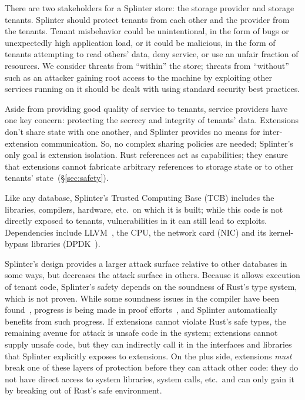 There are two stakeholders for a Splinter store: the storage
provider and storage tenants. Splinter should protect tenants from each other
and the provider from the tenants. Tenant
misbehavior could be unintentional, in the form of bugs or unexpectedly high
application load, or it could be malicious, in the form of tenants attempting
to read others' data, deny service, or use an unfair fraction of resources.
We consider threats from ``within'' the store; threats from ``without'' such
as an attacker gaining root access to the machine by exploiting other services
running on it should be dealt with using standard security best practices.


Aside from providing good quality of service to tenants, service providers
  have one key concern: protecting the secrecy and integrity of tenants' data.
Extensions don't share state with one another, and Splinter provides no means for
inter-extension communication. So, no complex sharing policies are needed;
Splinter's only goal is extension isolation.
Rust references act as capabilities; they ensure that extensions cannot
fabricate arbitrary references
to storage state or to other tenants' state~(\S\ref{sec:safety}).

Like any database, Splinter's Trusted Computing Base (TCB) includes the
    libraries, compilers, hardware, etc.\ on which it is built; while
    this code is not directly exposed to tenants, vulnerabilities in it can
    still lead to exploits.
Dependencies include LLVM~\cite{llvm}, the CPU, the 
    network card (NIC) and its kernel-bypass libraries (DPDK~\cite{dpdk}).

Splinter's design provides a larger attack surface relative to other
    databases in some ways, but decreases the attack surface in others.
Because it allows execution of tenant code, Splinter's safety depends on the
    soundness of Rust's type system, which is not proven.
While some soundness issues in the compiler have been
    found~\cite{rustc-unsound}, progress is being made in proof
    efforts~\cite{rustbelt-2018}, and Splinter automatically benefits from
    such progress.
If extensions cannot violate Rust's safe types, the remaining avenue for
    attack is unsafe code in the system; extensions cannot supply unsafe
    code, but they can indirectly call it in the 
    interfaces and libraries that Splinter explicitly exposes to extensions.
On the plus side, extensions \emph{must} break one of these layers of
    protection before they can attack other code: they do not have
    direct access to system libraries, system calls, etc.\ and can only gain it
    by breaking out of Rust's safe environment.

